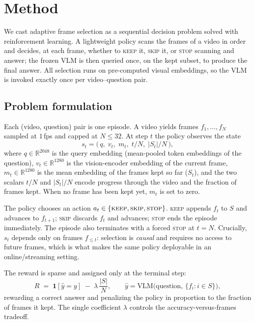 \documentclass{article}
\begin{document}
\section{Method}
\label{sec:method}

We cast adaptive frame selection as a sequential decision problem solved with
reinforcement learning. A lightweight policy scans the frames of a video in order
and decides, at each frame, whether to \textsc{keep} it, \textsc{skip} it, or
\textsc{stop} scanning and answer; the frozen VLM is then queried once, on the
kept subset, to produce the final answer. All selection runs on pre-computed
visual embeddings, so the VLM is invoked exactly once per video--question pair.

\subsection{Problem formulation}
\label{sec:mdp}
Each (video, question) pair is one episode. A video yields frames
$f_1, \dots, f_N$ sampled at $1$\,fps and capped at $N \le 32$. At step $t$ the
policy observes the state
\[
  s_t = \bigl(\, q,\; v_t,\; m_t,\; t/N,\; |S_t|/N \,\bigr),
\]
where $q \in \mathbb{R}^{2048}$ is the query embedding (mean-pooled token
embeddings of the question), $v_t \in \mathbb{R}^{1280}$ is the vision-encoder
embedding of the current frame, $m_t \in \mathbb{R}^{1280}$ is the mean embedding
of the frames kept so far ($S_t$), and the two scalars $t/N$ and $|S_t|/N$
encode progress through the video and the fraction of frames kept. When no frame
has been kept yet, $m_t$ is set to zero.

The policy chooses an action $a_t \in \{\textsc{keep}, \textsc{skip},
\textsc{stop}\}$. \textsc{keep} appends $f_t$ to $S$ and advances to $f_{t+1}$;
\textsc{skip} discards $f_t$ and advances; \textsc{stop} ends the episode
immediately. The episode also terminates with a forced \textsc{stop} at $t=N$.
Crucially, $s_t$ depends only on frames $f_{\le t}$: selection is \emph{causal}
and requires no access to future frames, which is what makes the same policy
deployable in an online/streaming setting.

The reward is sparse and assigned only at the terminal step:
\begin{equation}
  R \;=\; \mathbf{1}\!\left[\hat{y} = y\right] \;-\; \lambda \,\frac{|S|}{N},
  \qquad
  \hat{y} = \mathrm{VLM}\bigl(\text{question},\, \{f_i : i \in S\}\bigr),
  \label{eq:reward}
\end{equation}
rewarding a correct answer and penalizing the policy in proportion to the
fraction of frames it kept. The single coefficient $\lambda$ controls the
accuracy-versus-frames tradeoff.
\end{document}
